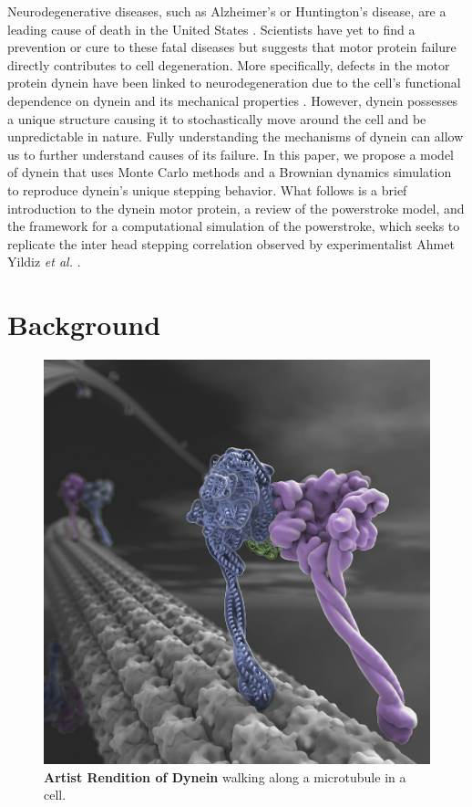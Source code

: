 
	Neurodegenerative diseases, such as Alzheimer's or Huntington's disease, are a leading cause of death in the United States \cite{gammon2014neurodegenerative}. Scientists have yet to find a prevention or cure to these fatal diseases but suggests that motor protein failure directly contributes to cell degeneration. More specifically, defects in the motor protein dynein have been linked to neurodegeneration due to the cell's functional dependence on dynein and its mechanical properties \cite{eschbach2011cytoplasmic}. However, dynein possesses a unique structure causing it to stochastically move around the cell and be unpredictable in nature. Fully understanding the mechanisms of dynein can allow us to further understand causes of its failure. In this paper, we propose a model of dynein that uses Monte Carlo methods and a Brownian dynamics simulation to reproduce dynein's unique stepping behavior. What follows is a brief introduction to the dynein motor protein, a review of the powerstroke model, and the framework for a computational simulation of the powerstroke, which seeks to replicate the inter head stepping correlation observed by experimentalist Ahmet Yildiz \textit{et al.} \cite{Dewitt2012}.  

\section{Background}

\begin{figure}[H]
	\centering
	\includegraphics[width=0.3\columnwidth]{Figures/dynein_walking_art.jpg}
	\caption[Artist Rendition of Dynein]{\textbf{Artist Rendition of Dynein} walking along a microtubule in a cell. \cite{JohnsonArt}}
	\label{fig:ArtDynein}
\end{figure}

